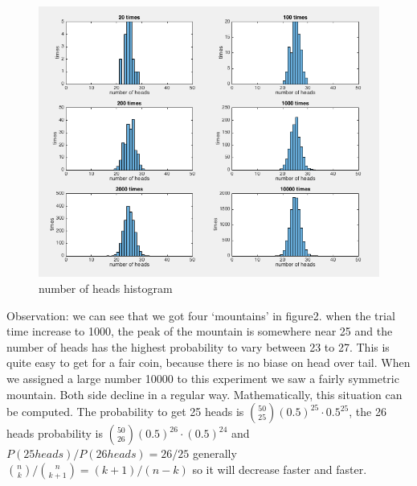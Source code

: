 \documentclass[twoside]{article}
\begin{document}
\begin{figure}[H]%
   \centering
   \includegraphics[scale = 0.6]{../data/exp1_a.png} 
   \caption{number of heads histogram}  
\end{figure}
Observation: we can see that we got four `mountains' in figure2. when the trial time increase to 1000, the peak of the mountain is somewhere near 25 and the number of heads has the highest probability to vary between 23 to 27. This is quite easy to get for a fair coin, because there is no biase on head over tail. When we assigned a large number 10000 to this experiment we saw a fairly symmetric mountain. Both side decline in a regular way. Mathematically, this situation can be computed. The probability to get 25 heads is $\binom {50}{25} (0.5)^{25}\cdot 0.5^{25}$, the 26 heads probability is $\binom {50}{26} (0.5)^{26}\cdot (0.5)^{24} $ and $P(25heads) / P(26heads) = 26 / 25$ generally $\binom nk / \binom{n}{k+1} = (k+1)/(n-k)$ so it will decrease faster and faster. 
\end{document}
